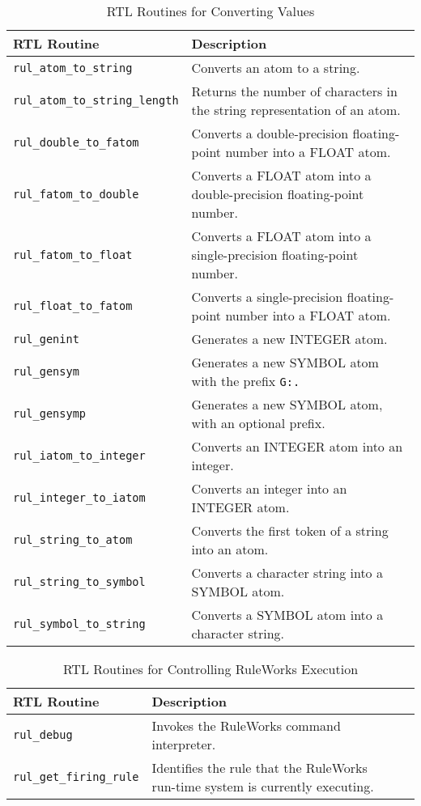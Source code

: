 \begin{table}[h]
  \begin{tabularx}{\columnwidth}{lX}
    \toprule
    RTL Routine &  Description \\
    \midrule
    \verb|rul_atom_to_string| & Converts an atom to a string. \\
    \verb|rul_atom_to_string_length| & Returns the number of characters in
                                       the string representation of an atom. \\
    \verb|rul_double_to_fatom| & Converts a double-precision floating-point 
                                 number into a FLOAT atom. \\
    \verb|rul_fatom_to_double| & Converts a FLOAT atom into a double-precision 
                                 floating-point number. \\
    \verb|rul_fatom_to_float| & Converts a FLOAT atom into a single-precision 
                                floating-point number.  \\
    \verb|rul_float_to_fatom| &  Converts a single-precision floating-point  
                                number into a FLOAT atom. \\
    \verb|rul_genint| & Generates a new INTEGER atom. \\
    \verb|rul_gensym| & Generates a new SYMBOL atom with the prefix \verb|G:.| \\    
    \verb|rul_gensymp| & Generates a new SYMBOL atom, with an optional prefix. \\    
    \verb|rul_iatom_to_integer| & Converts an INTEGER atom into an integer. \\
    \verb|rul_integer_to_iatom| & Converts an integer into an INTEGER atom. \\
    \verb|rul_string_to_atom| & Converts the first token of a string into an  
                                atom. \\
    \verb|rul_string_to_symbol| & Converts a character string into a SYMBOL atom. \\   
    \verb|rul_symbol_to_string| & Converts a SYMBOL atom into a character string. \\   
    \bottomrule
  \end{tabularx}
  \caption{RTL Routines for Converting Values}
  \label{t:6-9}
\end{table}

\begin{table}[h]
  \begin{tabularx}{\columnwidth}{lXXX}
    \toprule
    RTL Routine & Description \\
    \midrule
    \verb|rul_debug| & Invokes the RuleWorks command interpreter. \\
    \verb|rul_get_firing_rule| & Identifies the rule that the RuleWorks run-time 
                                 system is currently executing. \\
    \bottomrule
  \end{tabularx}
  \caption{RTL Routines for Controlling RuleWorks Execution}
  \label{t:6-10}
\end{table}

